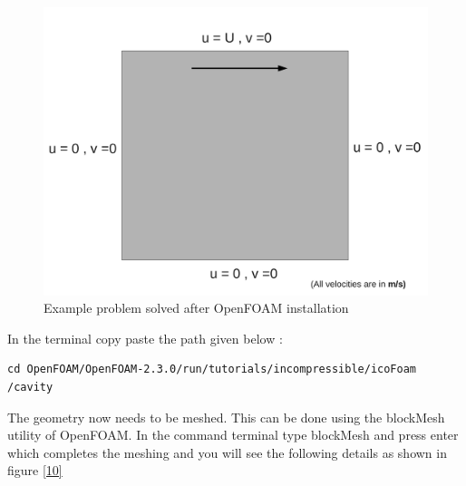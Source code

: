 \documentclass[a4paper,12pt]{report}
\begin{document}
\begin{figure}[ht]  
\begin{center}  
\includegraphics[scale=0.3]{9.pdf}
\caption{Example problem solved after OpenFOAM installation}
\label{9}
\end{center}  
\end{figure}

In the terminal copy paste the path given below :

\begin{lstlisting}[frame=single]
cd OpenFOAM/OpenFOAM-2.3.0/run/tutorials/incompressible/icoFoam
/cavity
\end{lstlisting}
  
\flushleft The geometry now needs to be meshed. This can be done using the blockMesh utility of OpenFOAM. In the command terminal type blockMesh and press enter which completes the meshing and you will see the following details as shown in figure \ref{10}
\end{document}
